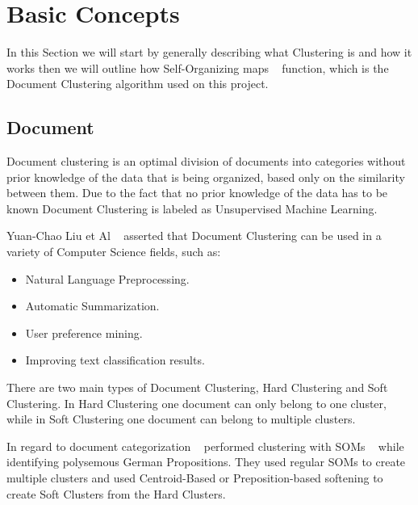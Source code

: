 \section{Basic Concepts} %
\label{sec:basic_concepts}
In this Section we will start by generally describing what Clustering is and how it works then we will outline how Self-Organizing maps ~\cite{Kohonen1990} function, which is the Document Clustering algorithm used on this project.


\subsection{Document} %
\label{sub:clustering}
Document clustering is an optimal division of documents into categories without prior knowledge of the data that is being organized, based only on the similarity between them. Due to the fact that no prior knowledge of the data has to be known Document Clustering is labeled as Unsupervised Machine Learning.

Yuan-Chao Liu et Al ~\cite{Liu2012b} asserted that Document Clustering can be used in a variety of Computer Science fields, such as:
\begin{itemize}
  \item Natural Language Preprocessing.
  \item Automatic Summarization.
  \item User preference mining.
  \item Improving text classification results.
\end{itemize}

There are two main types of Document Clustering, Hard Clustering and Soft Clustering. In Hard Clustering one document can only belong to one cluster, while in Soft Clustering one document can belong to multiple clusters. 

In regard to document categorization ~\citet{Springorum1998} performed clustering with SOMs ~\citep{Kohonen1990} while identifying polysemous German Propositions. They used regular SOMs to create multiple clusters and used Centroid-Based or Preposition-based softening to create Soft Clusters from the Hard Clusters.

